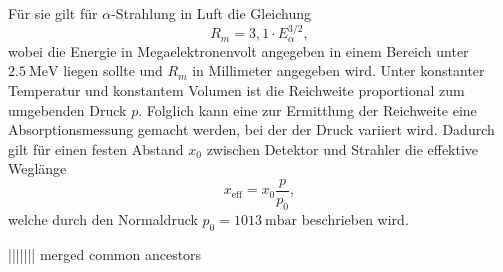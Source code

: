 Für sie gilt für $\alpha$-Strahlung in Luft die Gleichung
\begin{equation}
  R_m = 3,1 \cdot E_{\alpha}^{3/2},
\end{equation}
wobei die Energie in Megaelektronenvolt angegeben in einem Bereich unter $\SI{2,5}{\mega\electronvolt}$ liegen sollte und $R_m$ in Millimeter angegeben wird.
Unter konstanter Temperatur und konstantem Volumen ist die Reichweite proportional zum umgebenden Druck $p$.
Folglich kann eine zur Ermittlung der Reichweite eine Absorptionsmessung gemacht werden, bei der der Druck variiert wird.
Dadurch gilt für einen festen Abstand $x_0$ zwischen Detektor und Strahler die effektive Weglänge
\begin{equation}
  x_{\text{eff}} = x_0 \frac{p}{p_0},
\end{equation}
welche durch den Normaldruck $p_0 = \SI{1013}{\milli\bar}$ beschrieben wird. \cite{sample}

||||||| merged common ancestors
